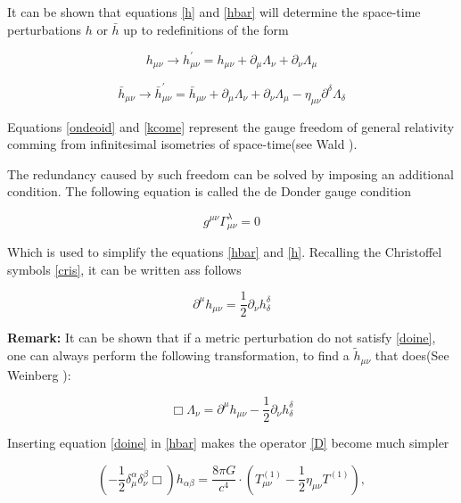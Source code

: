 It can be shown that equations \ref{h} and \ref{hbar} will determine the space-time perturbations $h$ or $\bar{h}$ up to redefinitions of the form

\begin{equation}\label{ondeoid}
h_{\mu\nu} \rightarrow  h^{'}_{\mu\nu} = h_{\mu\nu} + \partial_{\mu} \Lambda_{\nu} + \partial_{\nu} \Lambda_{\mu} 
\end{equation}


\begin{equation}\label{kcome}
\bar{h}_{\mu\nu} \rightarrow  \bar{h}^{'}_{\mu\nu} = \bar{h}_{\mu\nu} + \partial_{\mu} \Lambda_{\nu} + \partial_{\nu} \Lambda_{\mu} - \eta_{\mu\nu} \partial^{\delta} \Lambda_{\delta}
\end{equation}

Equations \ref{ondeoid} and \ref{kcome} represent the gauge freedom of general relativity comming from infinitesimal isometries of space-time(see Wald \cite[chapter X]{Wald:1984rg}). 

The redundancy caused by such freedom can be solved by imposing an additional condition. The following equation is called the de Donder gauge condition

\begin{equation}
g^{\mu\nu} \Gamma^{\lambda}_{\mu\nu} = 0
\end{equation}

Which is used to simplify the equations \ref{hbar} and \ref{h}. Recalling the Christoffel symbols \ref{cris}, it can be written ass follows  

\begin{equation}\label{doine}
\partial^{\mu} h_{\mu\nu} = \frac{1}{2} \partial_{\nu} h^{\delta}_{\delta}
\end{equation}

\textbf{Remark:} It can be shown that if a metric perturbation do not satisfy \ref{doine}, one can always perform the following transformation, to find a $\tilde{h}_{\mu\nu}$ that does(See Weinberg \cite[chapter 10]{Weinberg:1972kfs}):

\begin{equation}
\Box \Lambda_\nu = \partial^{\mu} h_{\mu\nu} - \frac{1}{2} \partial_{\nu} h^{\delta}_{\delta}
\end{equation} 

Inserting equation \ref{doine} in \ref{hbar} makes the operator \ref{D} become much simpler


\begin{equation}\label{waveeq}
\left( -\frac{1}{2} \delta_{\mu}^{\alpha} \delta_{\nu}^{\beta} \Box \right) h_{\alpha \beta} = \frac{8\pi G}{c^4} \cdot (T^{(1)}_{\mu\nu} - \frac{1}{2} \eta_{\mu\nu} T^{(1)}),
\end{equation}


